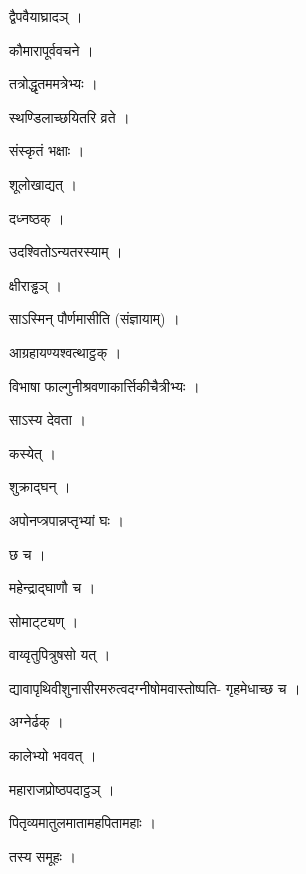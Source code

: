 \documentclass[10pt, openany]{book}
\begin{document}
\noindent द्वैपवैयाघ्रादञ् ।

\noindent कौमारापूर्ववचने ।

\noindent तत्रोद्धृतममत्रेभ्यः ।

\noindent स्थण्डिलाच्छयितरि व्रते ।

\noindent संस्कृतं भक्षाः ।

\noindent शूलोखाद्यत् ।

\noindent दध्नष्ठक् ।

\noindent उदश्वितोऽन्यतरस्याम् ।

\noindent क्षीराड्ढञ् ।

\noindent साऽस्मिन् पौर्णमासीति (संज्ञायाम्) ।

\noindent आग्रहायण्यश्वत्थाट्ठक् ।

\noindent विभाषा फाल्गुनीश्रवणाकार्त्तिकीचैत्रीभ्यः ।

\noindent साऽस्य देवता ।

\noindent कस्येत् ।

\noindent शुक्राद्घन् ।

\noindent अपोनप्त्रपान्नप्तृभ्यां घः ।

\noindent छ च ।

\noindent महेन्द्राद्घाणौ च ।

\noindent सोमाट्ट्यण् ।

\noindent वाय्वृतुपित्रुषसो यत् ।

\noindent द्यावापृथिवीशुनासीरमरुत्वदग्नीषोमवास्तोष्पति- गृहमेधाच्छ च ।

\noindent अग्नेर्ढक् ।

\noindent कालेभ्यो भववत् ।

\noindent महाराजप्रोष्ठपदाट्ठञ् ।

\noindent पितृव्यमातुलमातामहपितामहाः ।

\noindent तस्य समूहः ।
\end{document}
